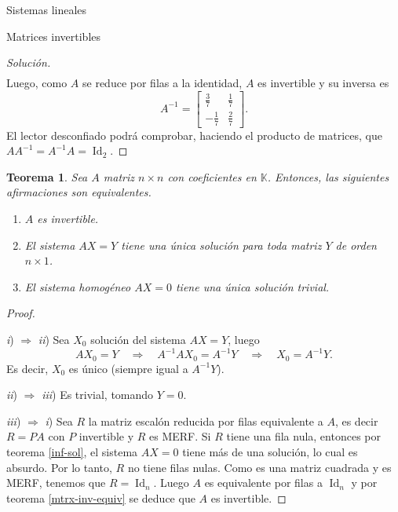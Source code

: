 \documentclass[a4paper,12pt,twoside,spanish,reqno]{amsbook}
\numberwithin{equation}{section}
\newtheorem{teorema}{Teorema}[section]
\theoremstyle{definition}
\theoremstyle{remark}
\newcommand{\Id}{\operatorname{Id}}
\newcommand{\K}{\mathbb K}
\begin{document}
\begin{chapter}{Sistemas lineales}
\begin{section}{Matrices invertibles}
\begin{proof}[Solución]
\begin{align*}
                \end{align*}
                Luego, como $A$ se reduce por filas a la identidad, $A$ es invertible y su inversa es  
                \begin{equation*}
                A^{-1}=\begin{bmatrix}\frac37&\frac17\\-\frac17&\frac27 \end{bmatrix}.
                \end{equation*}
                El lector desconfiado  podrá comprobar, haciendo el producto de matrices, que $AA^{-1} = A^{-1}A=\Id_2$.
            \end{proof}
            
            
            \begin{teorema}\label{mtrx-inv-equiv2} 
                Sea $A$ matriz $n \times n$ con coeficientes en $\K$. Entonces,  las siguientes afirmaciones son equivalentes. 
                \begin{enumerate}
                    \item[\textit{i})] $A$ es invertible.
                    \item[\textit{ii})] El sistema $AX=Y$ tiene una única solución para toda matriz $Y$ de orden $n \times 1$. 
                    \item[\textit{iii})] El sistema homogéneo $AX=0$ tiene una única solución trivial.
                \end{enumerate}
            \end{teorema}
            \begin{proof}
                
                \
                
                \textit{i}) $\Rightarrow$  \textit{ii}) Sea $X_0$ solución del sistema $AX=Y$, luego
                \begin{equation*}
                AX_0=Y  \quad \Rightarrow \quad  A^{-1}AX_0 = A^{-1}Y  \quad \Rightarrow \quad  X_0 = A^{-1}Y.
                \end{equation*}
                Es decir, $X_0$ es único (siempre igual  a $A^{-1}Y$).  
                
                
                \textit{ii}) $\Rightarrow$  \textit{iii}) Es trivial, tomando $Y =0$.
                
                
                
                \textit{iii}) $\Rightarrow$  \textit{i}) Sea $R$ la matriz escalón reducida por filas equivalente a $A$, es decir $R=PA$ con $P$ invertible y $R$ es MERF. Si $R$ tiene una fila nula, entonces por teorema \ref{inf-sol},  el sistema $AX =0$ tiene más de una solución, lo cual es absurdo.  Por lo tanto, $R$ no tiene filas nulas. Como es una matriz cuadrada y es MERF, tenemos que $R=\Id_n$. Luego $A$ es equivalente por filas a $\Id_n$ y por teorema \ref{mtrx-inv-equiv} se deduce que $A$ es invertible. 			
                

\end{proof}
\end{section}
\end{chapter}
\end{document}
